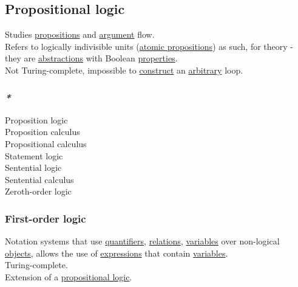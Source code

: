 \documentclass[a4paper,14pt,oneside]{book}
\begin{document}
\subsection{\label{orgb4404d4}Propositional logic}
\label{sec:org968cbb4}
Studies \hyperref[org2f6f757]{propositions} and \hyperref[org86f3f7b]{argument} flow.\\

Refers to logically indivisible units (\hyperref[org95fb894]{atomic propositions}) as such, for theory - they are \hyperref[org374d234]{abstractions} with Boolean \hyperref[orge0a1a8a]{properties}.\\

Not Turing-complete, impossible to \hyperref[org96b225a]{construct} an \hyperref[orgdcbda01]{arbitrary} loop.\\

\subsubsection{\emph{*}}
\label{sec:orgc626ffa}

\label{org93f68e7}Proposition logic\\
\label{org1a9cfc4}Proposition calculus\\
\label{orgeb4e82f}Propositional calculus\\
\label{org67f191f}Statement logic\\
\label{org4439f24}Sentential logic\\
\label{orgf2518e5}Sentential calculus\\
\label{orgb990bd1}Zeroth-order logic\\

\subsubsection{\label{org9b93d56}First-order logic}
\label{sec:org4a1ed26}
Notation systems that use \hyperref[org16b2a1a]{quantifiers}, \hyperref[org2049f4a]{relations}, \hyperref[org0f938c0]{variables} over non-logical \hyperref[org67f2abd]{objects}, allows the use of \hyperref[org907bfe3]{expressions} that contain \hyperref[org0f938c0]{variables}.\\

Turing-complete.\\

Extension of a \hyperref[orgb4404d4]{propositional logic}.\\
\end{document}
